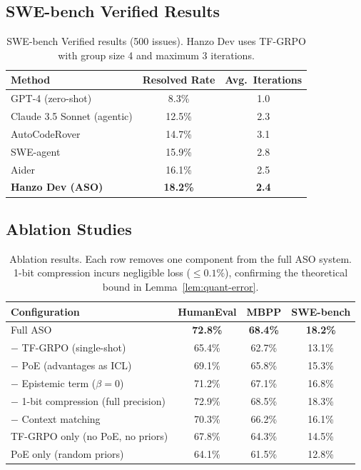 \subsection{SWE-bench Verified Results}

\begin{table}[h]
\centering
\begin{tabular}{lcc}
\toprule
Method & Resolved Rate & Avg.\ Iterations \\
\midrule
GPT-4 (zero-shot) & 8.3\% & 1.0 \\
Claude 3.5 Sonnet (agentic) & 12.5\% & 2.3 \\
AutoCodeRover~\cite{zhang2024autocoderover} & 14.7\% & 3.1 \\
SWE-agent~\cite{yang2024sweagent} & 15.9\% & 2.8 \\
Aider~\cite{aider2024} & 16.1\% & 2.5 \\
\textbf{Hanzo Dev (ASO)} & \textbf{18.2\%} & \textbf{2.4} \\
\bottomrule
\end{tabular}
\caption{SWE-bench Verified results (500 issues). Hanzo Dev uses TF-GRPO with
group size 4 and maximum 3 iterations.}
\label{tab:swebench}
\end{table}

\subsection{Ablation Studies}

\begin{table}[h]
\centering
\begin{tabular}{lccc}
\toprule
Configuration & HumanEval & MBPP & SWE-bench \\
\midrule
Full ASO & \textbf{72.8\%} & \textbf{68.4\%} & \textbf{18.2\%} \\
\midrule
$-$ TF-GRPO (single-shot) & 65.4\% & 62.7\% & 13.1\% \\
$-$ PoE (advantages as ICL) & 69.1\% & 65.8\% & 15.3\% \\
$-$ Epistemic term ($\beta = 0$) & 71.2\% & 67.1\% & 16.8\% \\
$-$ 1-bit compression (full precision) & 72.9\% & 68.5\% & 18.3\% \\
$-$ Context matching & 70.3\% & 66.2\% & 16.1\% \\
\midrule
TF-GRPO only (no PoE, no priors) & 67.8\% & 64.3\% & 14.5\% \\
PoE only (random priors) & 64.1\% & 61.5\% & 12.8\% \\
\bottomrule
\end{tabular}
\caption{Ablation results. Each row removes one component from the full ASO
system. 1-bit compression incurs negligible loss ($\leq 0.1\%$), confirming
the theoretical bound in Lemma~\ref{lem:quant-error}.}
\label{tab:ablation}
\end{table}

